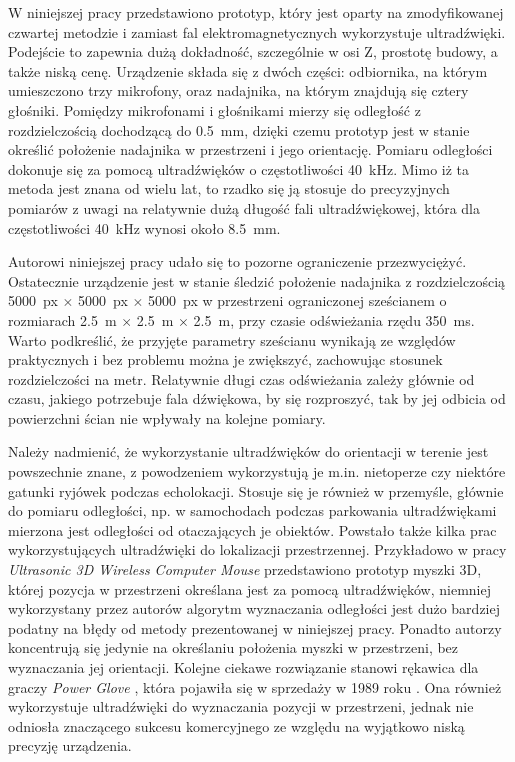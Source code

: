  W niniejszej pracy przedstawiono prototyp, który jest oparty na zmodyfikowanej czwartej metodzie i zamiast 
 fal elektromagnetycznych wykorzystuje ultradźwięki. 
 Podejście to zapewnia dużą dokładność, szczególnie w osi Z, prostotę budowy, a także niską cenę.
 Urządzenie składa się z dwóch części: odbiornika, na którym umieszczono trzy mikrofony, oraz nadajnika,
 na którym znajdują się cztery głośniki. Pomiędzy mikrofonami i głośnikami mierzy się odległość z rozdzielczością
 dochodzącą do \SI{0,5}{mm}, dzięki czemu prototyp jest w stanie określić położenie nadajnika
w przestrzeni i jego orientację. 
Pomiaru odległości dokonuje się za pomocą ultradźwięków o częstotliwości \SI{40}{kHz}.
Mimo iż ta metoda jest znana od wielu lat, to rzadko się ją stosuje do precyzyjnych pomiarów
z uwagi na relatywnie dużą długość fali ultradźwiękowej,
która dla częstotliwości \SI{40}{kHz} wynosi około \SI{8.5}{mm}.

Autorowi niniejszej pracy udało się to pozorne ograniczenie przezwyciężyć.
Ostatecznie urządzenie jest w stanie śledzić położenie nadajnika z rozdzielczością 
\SI{5000}{px} $\times$ \SI{5000}{px} $\times$ \SI{5000}{px} w przestrzeni ograniczonej sześcianem o rozmiarach 
\SI{2,5}{m} $\times$ \SI{2,5}{m}  $\times$ \SI{2,5}{m}, przy czasie odświeżania rzędu \SI{350}{ms}.
Warto podkreślić, że przyjęte parametry sześcianu wynikają ze względów praktycznych i bez 
problemu można je zwiększyć, zachowując stosunek rozdzielczości na metr.
Relatywnie długi czas odświeżania zależy głównie od czasu,  
 jakiego potrzebuje fala dźwiękowa, by się rozproszyć,
 tak by jej odbicia od powierzchni ścian nie wpływały na kolejne pomiary.

Należy nadmienić, że wykorzystanie ultradźwięków do orientacji w terenie jest powszechnie znane,
z powodzeniem wykorzystują je m.in. nietoperze czy niektóre gatunki ryjówek podczas echolokacji. Stosuje się je również 
w przemyśle, głównie do pomiaru odległości, np. w samochodach podczas parkowania ultradźwiękami
mierzona jest odległości od otaczających je obiektów. Powstało także kilka prac wykorzystujących ultradźwięki
do lokalizacji przestrzennej. 
Przykładowo w pracy \textit{Ultrasonic 3D Wireless Computer Mouse} \cite{bib:mouse} przedstawiono prototyp myszki 3D, której
pozycja w przestrzeni określana jest za pomocą ultradźwięków, niemniej wykorzystany przez autorów algorytm wyznaczania 
odległości jest dużo bardziej podatny na błędy od metody prezentowanej w niniejszej pracy. Ponadto autorzy koncentrują się jedynie
na określaniu położenia myszki w przestrzeni, bez wyznaczania jej orientacji.
Kolejne ciekawe rozwiązanie stanowi rękawica dla graczy 
\textit{Power Glove} \cite{bib:powerGlove}, która pojawiła się w sprzedaży w 1989 roku \cite{bib:powerGlove2}. 
Ona również wykorzystuje ultradźwięki do wyznaczania pozycji
w przestrzeni, jednak nie odniosła  znaczącego sukcesu komercyjnego ze względu na wyjątkowo niską precyzję urządzenia.

